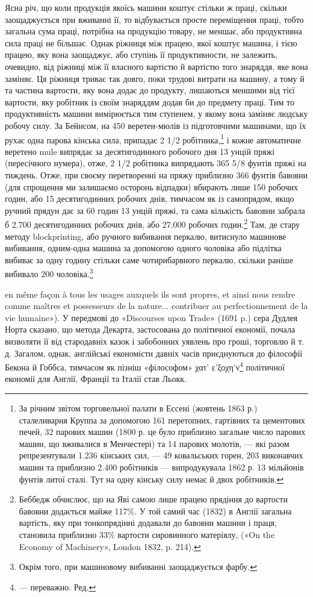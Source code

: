 Ясна річ, що коли продукція якоїсь машини коштує стільки ж
праці, скільки заощаджується при вживанні її, то відбувається
просте переміщення праці, тобто загальна сума праці, потрібна
на продукцію товару, не меншає, або продуктивна сила праці не
більшає. Однак ріжниця між працею, якої коштує машина, і
тією працею, яку вона заощаджує, або ступінь її продуктивности,
не залежить, очевидно, від ріжниці між її власного вартістю й
вартістю того знаряддя, яке вона заміняє. Ця ріжниця триває
так довго, поки трудові витрати на машину, а тому й та частина
вартости, яку вона додає до продукту, лишаються меншими від
тієї вартости, яку робітник із своїм знаряддям додав би до предмету
праці. Тим то продуктивність машини вимірюється тим
ступенем, у якому вона заміняє людську робочу силу. За Бейнсом,
на 450 веретен-мюлів із підготовчими машинами, що їх рухає
одна парова кінська сила, припадає 2 1/2 робітника,\footnote{
За річним звітом торговельної палати в Ессені (жовтень 1863 р.)
сталеливарня Круппа за допомогою 161 перетопних, гартівних та цементових
печей, 32 парових машин (1800 р. це було приблизно загальне число
парових машин, що вживалися в Менчестері) та 14 парових молотів, —
які разом репрезентували 1.236 кінських сил, — 49 ковальських горен,
203 виконавчих машин та приблизно 2.400 робітників — випродукувала
1862 р. 13 мільйонів фунтів литої сталі. Тут на одну кінську силу немає
й двох робітників.
} і кожне
автоматичне веретено mule випрядає за десятигодинного робочого
дня 13 унцій пряжі (пересічного нумера), отже, 2 1/2 робітника
випрядають 365 5/8 фунтів пряжі на тиждень. Отже, при своєму
перетворенні на пряжу приблизно 366 фунтів бавовни (для спрощення
ми залишаємо осторонь відпадки) вбирають лише 150 робочих
годин, або 15 десятигодинних робочих днів, тимчасом як із
самопрядом, якщо ручний прядун дає за 60 годин 13 унцій пряжі,
та сама кількість бавовни забрала б 2.700 десятигодинних робочих
днів, або 27.000 робочих годин.\footnote{
Беббедж обчислює, що на Яві самою лише працею прядіння до
вартости бавовни додається майже 117\%. У той самий час (1832) в Англії
загальна вартість, яку при тонкопрядінні додавали до бавовни машини
і праця, становила приблизно 33\% вартости сировинного матеріялу,
(«On the Economy of Machinery», London 1832, p. 214).
} Там, де стару методу
blockprinting, або ручного вибивання перкалю, витиснуло машинове
вибивання, одним-одна машина за допомогою одного чоловіка
або підлітка вибиває за одну годину стільки саме чотирибарвного
перкалю, скільки раніше вибивало 200 чоловіка.\footnote{
Окрім того, при машиновому вибиванні заощаджується фарбу.
}

en même façon à tous les usages auxquels ils sont propres, et ainsi nous
rendre comme maîtres et possesseurs de la nature... contribuer au perfectionnement
de la vie humaine»). У передмові до «Discourses upon Trade»
(1691 p.) сера Дудлея Норта сказано, що метода Декарта, застосована
до політичної економії, почала визволяти її від стародавніх казок і забобонних
уявлень про гроші, торговлю й т. д. Загалом, однак, англійські
економісти давніх часів приєднуються до філософії Бекона й Гоббса, тимчасом
як пізніш «філософом» χατ’ ε’ξοχη'ν\footnote*{
— переважно. Ред.
} політичної економії для Англії,
Франції та Італії став Льокк.